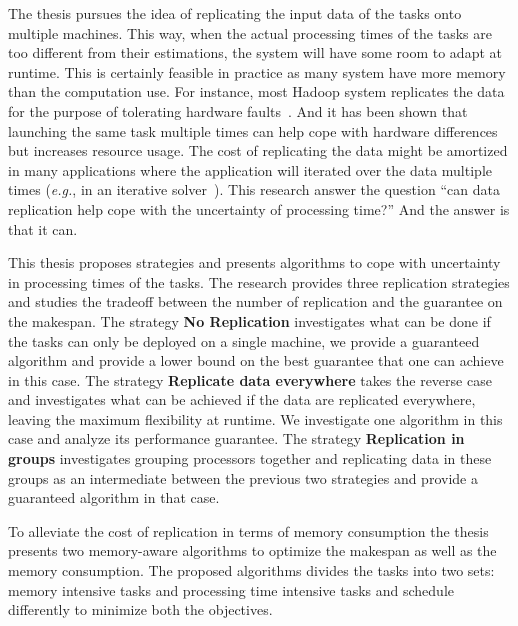  The thesis pursues the idea of replicating the input data
 of the tasks onto multiple machines. This way, when the actual
 processing times of the tasks are too different from their
 estimations, the system will have some room to adapt at runtime. This
 is certainly feasible in practice as many system have more memory than
 the computation use. For instance, most Hadoop system replicates the
 data for the purpose of tolerating hardware
 faults~\cite{White:2009:HDG:1717298}. And it has been shown that
 launching the same task multiple times can help cope with hardware
 differences~\cite{DBLP:journals/corr/WangJW14} but increases resource
 usage. The cost of replicating the data might be amortized in many
 applications where the application will iterated over the data
 multiple times ({\em e.g.}, in an iterative solver~\cite{Zhou12-P2S2,Zhou12-Cluster}). This research 
 answer the question ``can data replication help cope with the
 uncertainty of processing time?''  And the answer is that it can.
 
  This thesis proposes strategies and presents algorithms to cope with uncertainty in processing times of the tasks. The research provides three  replication strategies and studies the tradeoff between the number of replication and the guarantee on the makespan. The strategy \textbf{No Replication} investigates what can be
   done if the tasks can only be deployed on a single machine, we
   provide a guaranteed algorithm and provide a lower bound on the best
   guarantee that one can achieve in this case. The strategy \textbf{Replicate data everywhere} takes
   the reverse case and investigates what can be achieved if the data are
   replicated everywhere, leaving the maximum flexibility at runtime. We
   investigate one algorithm in this case and analyze its performance
   guarantee. The strategy \textbf{Replication in groups} investigates grouping processors
   together and replicating data in these groups as an intermediate
   between the previous two strategies and provide a guaranteed algorithm
   in that case.

To alleviate the cost of replication in terms of memory consumption the thesis  presents two memory-aware algorithms to optimize the makespan as well as the memory consumption. The proposed algorithms divides the tasks into two sets: memory intensive tasks and processing time intensive tasks and schedule differently to minimize both the objectives.    
   
 
 
